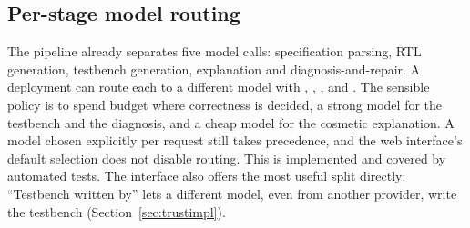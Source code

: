 \subsection{Per-stage model routing}
The pipeline already separates five model calls: specification parsing, RTL generation, testbench generation, explanation and diagnosis-and-repair. A deployment can route each to a different model with , , ,  and . The sensible policy is to spend budget where correctness is decided, a strong model for the testbench and the diagnosis, and a cheap model for the cosmetic explanation. A model chosen explicitly per request still takes precedence, and the web interface's default selection does not disable routing. This is implemented and covered by automated tests. The interface also offers the most useful split directly: ``Testbench written by'' lets a different model, even from another provider, write the testbench (Section~\ref{sec:trustimpl}).

